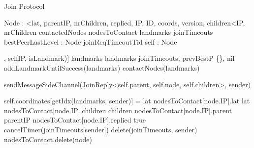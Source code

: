 
\begin{algorithm}{}
\caption{Join Protocol} \label{alg:memb:join}
\begin{algorithmic}[1]
    \asdtypes
        \State Node : <lat, parentIP, nrChildren, replied, IP, ID, coords, version, children<IP,  nrChildren\>\>
    \asdend
    \asdstate \label{alg:memb:join:state}
        \State contactedNodes 
        \State nodesToContact 
        \State landmarks 
        \State joinTimeouts 
        \State bestPeerLastLevel : Node 
        \State joinReqTimeoutTid 
        \State self : Node 
    \asdend

\asdupon[Init(landmarks : IP[], selfIP, isLandmark)] \label{alg:memb:join:init}
    \State landmarks \asdassign landmarks 
    \State joinTimeouts, prevBestP \asdassign \{\}, nil
    {addLandmarkUntilSuccess(landmarks) \label{alg:memb:join:add_land}} 
    {contactNodes(landmarks) \label{alg:memb:join:contact_landm}} 
\asdend


 \label{alg:memb:join:recv_join}
    \State sendMessageSideChannel(JoinReply<self.parent, self.node, self.children>, sender) 
\asdend
    
  \label{alg:memb:join:recv_join_reply}
                \State self.coordinates[getIdx(landmarks, sender)] = lat
            \EndIf
            \State nodesToContact[node.IP].lat \asdassign lat
            \State nodesToContact[node.IP].children \asdassign children
            \State nodesToContact[node.IP].parent \asdassign parentIP
            \State nodesToContact[node.IP].replied \asdassign true
            \State cancelTimer(joinTimeouts[sender])
            \State delete(joinTimeouts, sender)
        \Else
            \State nodesToContact.delete(node)
        \EndIf
\asdend


\end{algorithmic}
\end{algorithm}
